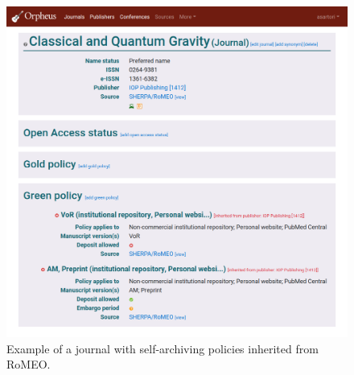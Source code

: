 \documentclass[british, 12pt]{article}
\begin{document}
\begin{figure}
  \includegraphics[width=\textwidth]{journal-inheriting-problematic-policies-from-romeo}
  \caption{Example of a journal with self-archiving policies inherited from RoMEO.}
  \label{figure-journal-inheriting-from-romeo}
\end{figure} 
\end{document}
